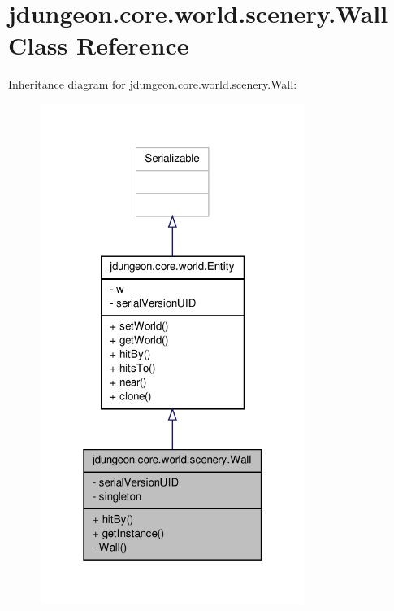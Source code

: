 \hypertarget{classjdungeon_1_1core_1_1world_1_1scenery_1_1_wall}{
\section{jdungeon.core.world.scenery.Wall Class Reference}
\label{classjdungeon_1_1core_1_1world_1_1scenery_1_1_wall}
}


Inheritance diagram for jdungeon.core.world.scenery.Wall:
\nopagebreak
\begin{figure}[H]
\begin{center}
\leavevmode
\includegraphics[width=244pt]{classjdungeon_1_1core_1_1world_1_1scenery_1_1_wall__inherit__graph}
\end{center}
\end{figure}


